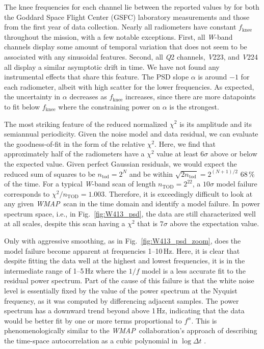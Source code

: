 \documentclass[twocolumn]{../../common/aa}
\def\WMAP{\emph{WMAP}}
\newcommand{\Q}[0]{\textit Q}
\newcommand{\V}[0]{\textit V}
\newcommand{\W}[0]{\textit W}
\begin{document}
The knee frequencies for each channel lie between the reported values by \citet{jarosik2003a} for both the Goddard Space Flight Center (GSFC) laboratory measurements and those from the first year of data collection. Nearly all radiometers have constant $f_\mathrm{knee}$ throughout the mission, with a few notable exceptions. First, all \W-band channels display some amount of temporal variation that does not seem to be associated with any sinusoidal features. Second, all \Q2 channels, \V223, and \V224 all display a similar asymptotic drift in time. We have not found any instrumental effects that share this feature.
The PSD slope $\alpha$ is around $-1$ for each radiometer, albeit with high scatter for the lower frequencies. As expected, the uncertainty in $\alpha$ decreases as $f_\mathrm{knee}$ increases, since there are more datapoints to fit below $f_\mathrm{knee}$ where the constraining power on $\alpha$ is the strongest.


The most striking feature of the reduced normalized $\chi^2$ is its amplitude
and its semiannual periodicity.  Given the noise model and data residual, we
can evaluate the goodness-of-fit in the form of the relative $\chi^2$. Here, we
find that approximately half of the radiometers have a $\chi^2$ value at least
$6\sigma$ above or below the expected value.  Given perfect Gaussian residuals,
we would expect the reduced sum of squares to be $n_\mathrm{tod}=2^N$ and be
within $\sqrt{2n_\mathrm{tod}}=2^{(N+1)/2}$ 68\,\% of the time. For a typical
\W-band scan of length $n_\mathrm{TOD}=2^{22}$, a $10\sigma$ model failure
corresponds to $\chi^2/n_\mathrm{TOD}=1.003$. Therefore, it is exceedingly
difficult to look at any given \WMAP\ scan in the time domain and identify a
model failure. In power spectrum space, i.e., in Fig.~\ref{fig:W413_psd}, the
data are still characterized well at all scales, despite this scan having a
$\chi^2$ that is $7\sigma$ above the expectation value. 




Only with aggressive smoothing, as in Fig.~\ref{fig:W413_psd_zoom}, does the
model failure become apparent at frequencies 1--10\,Hz.  Here, it is clear that
despite fitting the data well at the highest and lowest frequencies, it is in
the intermediate range of 1--5\,Hz where the $1/f$ model is a less accurate
fit to the residual power spectrum. Part of the cause of this failure is that the white
noise level is essentially fixed by the value of the power spectrum at the
Nyquist frequency, as it was computed by differencing adjacent samples. The
power spectrum has a downward trend beyond above 1\,Hz, indicating that the
data would be better fit by one or more terms proportional to $f^\alpha$. This
is phenomenologically similar to the \WMAP\ collaboration's approach of
describing the time-space autocorrelation as a cubic polynomial in $\log\Delta t$ \citep{jarosik2007}.  
\end{document}
